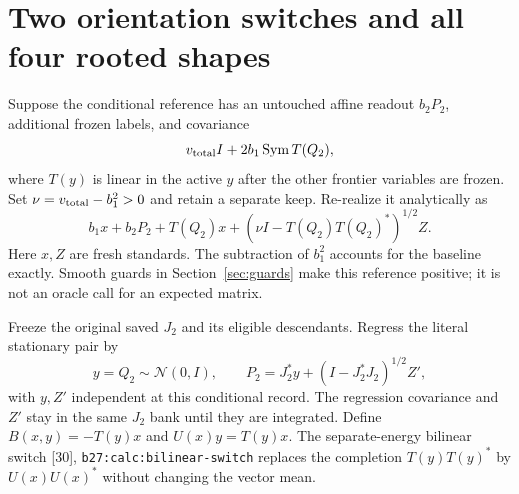 \documentclass[11pt]{article}
\numberwithin{equation}{section}
\theoremstyle{remark}\newtheorem{remark}[theorem]{Remark}
\newcommand{\N}{\mathcal N}\newcommand{\Cov}{\operatorname{Cov}}
\newcommand{\Sym}{\operatorname{Sym}}\newcommand{\HS}{\mathrm{HS}}
\newcommand{\src}[1]{\texttt{\nolinkurl{#1}}}
\newcommand{\low}[1]{\textup{[30]}, \src{#1}}
\begin{document}
\section{Two orientation switches and all four rooted shapes}
\label{sec:switch}
Suppose the conditional reference has an untouched affine readout $b_2P_2$, additional frozen labels, and covariance
\[
 v_{\rm total}I+2b_1\Sym T(Q_2),
\]
where $T(y)$ is linear in the active $y$ after the other frontier variables are frozen. Set $\nu=v_{\rm total}-b_1^2>0$ and retain a separate keep. Re-realize it analytically as
\begin{equation}\label{eq:rerender}
 b_1x+b_2P_2+T(Q_2)x+
       (\nu I-T(Q_2)T(Q_2)^*)^{1/2}Z.
\end{equation}
Here $x,Z$ are fresh standards. The subtraction of $b_1^2$ accounts for the baseline exactly. Smooth guards in Section~\ref{sec:guards} make this reference positive; it is not an oracle call for an expected matrix.

Freeze the original saved $J_2$ and its eligible descendants. Regress the literal stationary pair by
\begin{equation}\label{eq:regression}
 y=Q_2\sim\N(0,I),\qquad
 P_2=J_2^*y+(I-J_2^*J_2)^{1/2}Z',
\end{equation}
with $y,Z'$ independent at this conditional record. The regression covariance and $Z'$ stay in the same $J_2$ bank until they are integrated. Define $B(x,y)=-T(y)x$ and $U(x)y=T(y)x$. The separate-energy bilinear switch \low{b27:calc:bilinear-switch} replaces the completion $T(y)T(y)^*$ by $U(x)U(x)^*$ without changing the vector mean.
\end{document}
